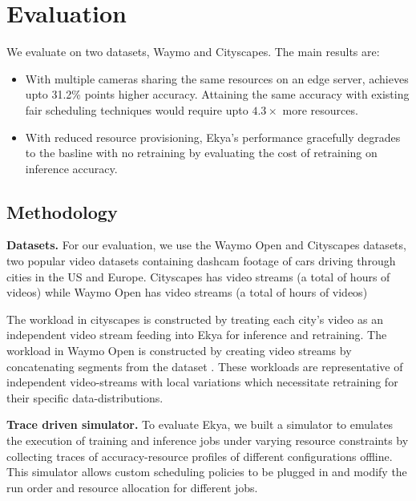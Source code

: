 \section{Evaluation}
\label{sec:evaluation}

We evaluate \name{} on two datasets, Waymo and Cityscapes. The main results are:

\begin{itemize}
    \item With multiple cameras sharing the same resources on an edge server, \name{} achieves upto 31.2\% points higher accuracy. Attaining the same accuracy with existing fair scheduling techniques would require upto $4.3\times$ more resources.
    \item With reduced resource provisioning, Ekya's performance gracefully degrades to the basline with no retraining by evaluating the cost of retraining on inference accuracy. 
\end{itemize}

\subsection{Methodology}
\label{subsec:eval-setup}

\noindent\textbf{Datasets.} For our evaluation, we use the Waymo Open\cite{waymo} and Cityscapes\cite{cityscapes} datasets, two popular video datasets containing dashcam footage of cars driving through cities in the US and Europe. Cityscapes has  video streams (a total of  hours of videos) while Waymo Open has  video streams (a total of  hours of videos)

The workload in cityscapes is constructed by treating each city's video as an independent video stream feeding into Ekya for inference and retraining. The workload in Waymo Open is constructed by creating video streams by concatenating segments from the dataset . These workloads are representative of independent video-streams with local variations which necessitate retraining for their specific data-distributions.

\noindent\textbf{Trace driven simulator.}
To evaluate Ekya, we built a simulator to emulates the execution of training and inference jobs under varying resource constraints by collecting traces of accuracy-resource profiles of different configurations offline. This simulator allows custom scheduling policies to be plugged in and modify the run order and resource allocation for different jobs.

